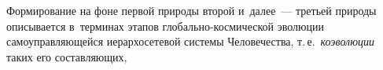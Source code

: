 \begin{multicols}{2}
  
  Формирование на фоне первой природы второй и~далее~--- третьей природы 
описывается в~терминах этапов гло\-баль\-но-кос\-ми\-че\-ской эволюции 
самоуправляющейся ие\-рар\-хо\-се\-те\-вой сис\-те\-мы Человечества, т.\,е.\ 
\textit{коэволюции} таких его со\-став\-ля\-ющих,\linebreak\vspace*{-12pt}

\pagebreak

\end{multicols}

\begin{figure*} %
\vspace*{1pt}
\begin{center}  
\mbox{%
\epsfxsize=163mm
}
\end{center}
\vspace*{-9pt}
\vspace*{-6pt}
\end{figure*}


